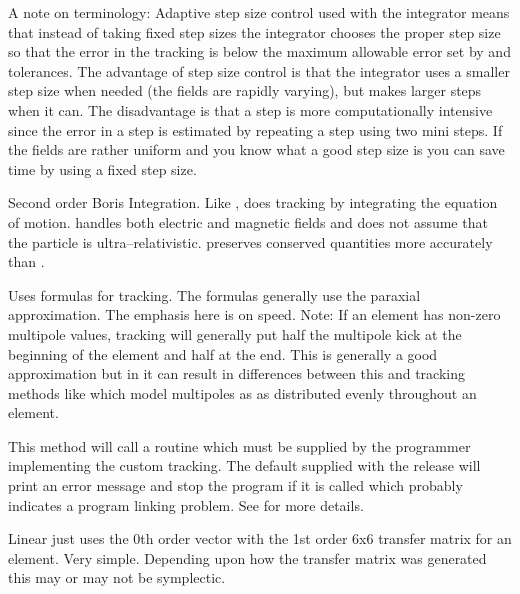 A note on terminology: Adaptive step size control used with the
 integrator means that
instead of taking fixed step sizes the integrator chooses the proper
step size so that the error in the tracking is below the maximum
allowable error set by  and  tolerances. The
advantage of step size control is that the integrator uses a smaller
step size when needed (the fields are rapidly varying), but makes
larger steps when it can. The disadvantage is that a step is more
computationally intensive since the error in a step is estimated by
repeating a step using two mini steps. If the fields are rather
uniform and you know what a good step size is you can save time by
using a fixed step size.

\begin{description}

\item[\vn{Boris}]
Second order Boris Integration\cite{b:boris}. Like ,
 does tracking by integrating the equation of
motion.  handles both electric and magnetic fields and does
not assume that the particle is ultra--relativistic.  preserves
conserved quantities more accurately than .

\item[\vn{Bmad_Standard}]
Uses formulas for tracking. The formulas generally use the paraxial
approximation.  The emphasis here is on speed. Note: If an element has
non-zero multipole values,  tracking will generally
put half the multipole kick at the beginning of the element and half
at the end. This is generally a good approximation but in it can
result in differences between this and tracking methods like
 which model multipoles as as distributed evenly
throughout an element.

\item[\vn{Custom}]
This method will call a routine  which must be
supplied by the programmer implementing the custom tracking. The
default  supplied with the \bmad release will print
an error message and stop the program if it is called which probably
indicates a program linking problem. See  for more details.

\item[\vn{Linear}]
Linear just uses the 0th order vector with the 1st order 6x6 transfer
matrix for an element. Very simple.  Depending upon how the transfer
matrix was generated this may or may not be symplectic.


\end{description}
